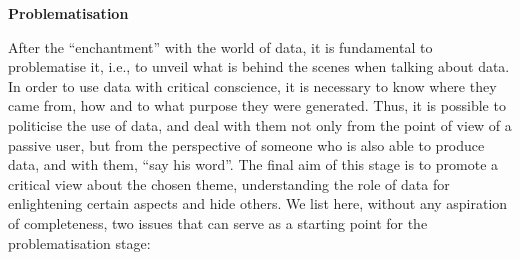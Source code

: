 \noindent \textbf{Problematisation}

After the “enchantment” with the world of data, it is fundamental to problematise it, i.e., to unveil what is behind the scenes when talking about data. In order to use data with critical conscience, it is necessary to know where they came from, how and to what purpose they were generated. Thus, it is possible to politicise the use of data, and deal with them not only from the point of view of a passive user, but from the perspective of someone who is also able to produce data, and with them, “say his word”. The final aim of this stage is to promote a critical view about the chosen theme, understanding the role of data for enlightening certain aspects and hide others. We list here, without any aspiration of completeness, two issues that can serve as a starting point for the problematisation stage:

